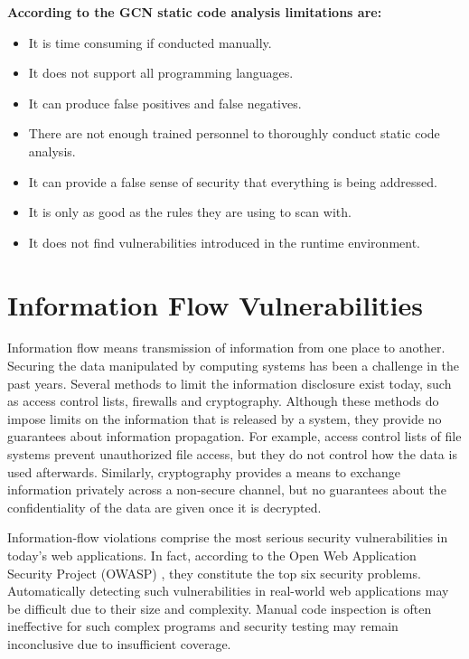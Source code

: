 \textbf{According to the GCN \cite{ref_87_gcn:gcn} static code analysis limitations are:}
\begin{itemize}
	\item It is time consuming if conducted manually.
	\item It does not support all programming languages.
	\item It can produce false positives and false negatives.
	\item There are not enough trained personnel to thoroughly conduct static code analysis.
	\item It can provide a false sense of security that everything is being addressed.
	\item It is only as good as the rules they are using to scan with.
	\item It does not find vulnerabilities introduced in the runtime environment.
\end{itemize}

\section{Information Flow Vulnerabilities}

Information flow means transmission of information from one place to another. Securing the data manipulated by computing systems has been a challenge in the past years. Several methods to limit the information disclosure exist today, such as access control lists, firewalls and cryptography. Although these methods do impose limits on the information that is released by a system, they provide no guarantees about information propagation. For example, access control lists of file systems prevent unauthorized file access, but they do not control how the data is used afterwards. Similarly, cryptography provides a means to exchange information privately across a non-secure channel, but no guarantees about the confidentiality of the data are given once it is decrypted.

Information-flow violations \cite{ref_103_denning1977certification} comprise the most serious security
vulnerabilities in today's web applications. In fact, according to
the Open Web Application Security Project (OWASP) \cite{ref_104_owasp:owasp}, they
constitute the top six security problems. Automatically detecting
such vulnerabilities in real-world web applications may be difficult
due to their size and complexity. Manual code inspection is often
ineffective for such complex programs and security testing may
remain inconclusive due to insufficient coverage.


